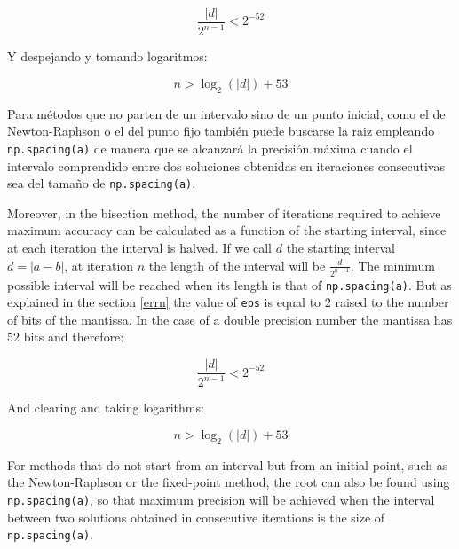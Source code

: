 \begin{paracol}{2}
\begin{equation*}
\frac{\vert d \vert}{2^{n-1}}<2^{-52} 
\end{equation*}

Y despejando y tomando logaritmos:

\begin{equation*}
n > \log_{2}(\vert d \vert)+53
\end{equation*}

Para métodos que no parten de un intervalo sino de un punto inicial, como el de Newton-Raphson o el del punto fijo también puede buscarse la raiz empleando \texttt{np.spacing(a)} de manera que se alcanzará la precisión máxima cuando el intervalo comprendido entre dos soluciones obtenidas en iteraciones consecutivas sea del tamaño de \texttt{np.spacing(a)}. 

\switchcolumn
Moreover, in the bisection method, the number of iterations required to achieve maximum accuracy can be calculated as a function of the starting interval, since at each iteration the interval is halved. If we call $d$ the starting interval $d=\vert a-b \vert$, at iteration $n$ the length of the interval will be $\frac{d}{2^{n-1}}$. The minimum possible interval will be reached when its length is that of \texttt{np.spacing(a)}. But as explained in the section \ref{errn} the value of \texttt{eps} is equal to $2$ raised to the number of bits of the mantissa. In the case of a double precision number the mantissa has $52$ bits and therefore:

\begin{equation*}
\frac{\vert d \vert}{2^{n-1}}<2^{-52} 
\end{equation*}

And clearing and taking logarithms:

\begin{equation*}
n > \log_{2}(\vert d \vert)+53
\end{equation*}

For methods that do not start from an interval but from an initial point, such as the Newton-Raphson or the fixed-point method, the root can also be found using \texttt{np.spacing(a)}, so that maximum precision will be achieved when the interval between two solutions obtained in consecutive iterations is the size of \texttt{np.spacing(a)}.
\end{paracol}




